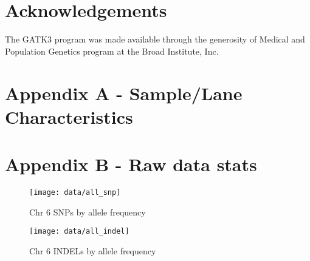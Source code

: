 \documentclass{article}
\begin{document}
  \section{Acknowledgements}
  The GATK3 program was made available through the generosity of Medical and
  Population Genetics program at the Broad Institute, Inc.

  \newpage
  \section{Appendix A - Sample/Lane Characteristics}
  \begin{center}
  \end{center}

  \newpage
  \section{Appendix B - Raw data stats}
  \begin{figure}
    \caption{Chr 6 SNPs by allele frequency}
    \texttt{[image: data/all\_snp]}
  \end{figure}
  \begin{figure}
    \caption{Chr 6 INDELs by allele frequency}
    \texttt{[image: data/all\_indel]}
  \end{figure}
\end{document}
